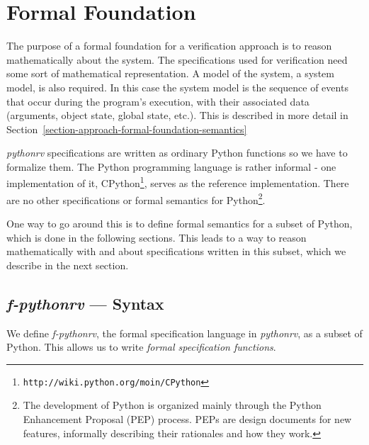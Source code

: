 
\section{Formal Foundation} \label{section-approach-formal-foundation}

The purpose of a formal foundation for a verification approach is to reason
mathematically about the system. The specifications used for verification need
some sort of mathematical representation. A model of the system, a system
model, is also required. In this case the system model is the sequence of
events that occur during the program's execution, with their associated data
(arguments, object state, global state, etc.). This is described in more detail
in Section~\ref{section-approach-formal-foundation-semantics}

\textit{pythonrv} specifications are written as ordinary Python functions so we
have to formalize them.  The Python programming language is rather informal -
one implementation of it,
CPython\footnote{\texttt{http://wiki.python.org/moin/CPython}}, serves as the
reference implementation.  There are no other specifications or formal
semantics for Python\footnote{The development of Python is organized mainly
through the Python Enhancement Proposal (PEP) process. PEPs are design
documents for new features, informally describing their rationales and how they
work.}.

One way to go around this is to define formal semantics for a subset of Python,
which is done in the following sections. This leads to a way to reason
mathematically with and about specifications written in this subset, which we
describe in the next section.





\subsection{\textit{f-pythonrv} --- Syntax}
\label{section-approach-python-subset}
\lstset{language=Python,numbers=left}

We define \textit{f-pythonrv}, the formal specification language in
\textit{pythonrv}, as a subset of Python. This allows us to write
\textit{formal specification functions}.

